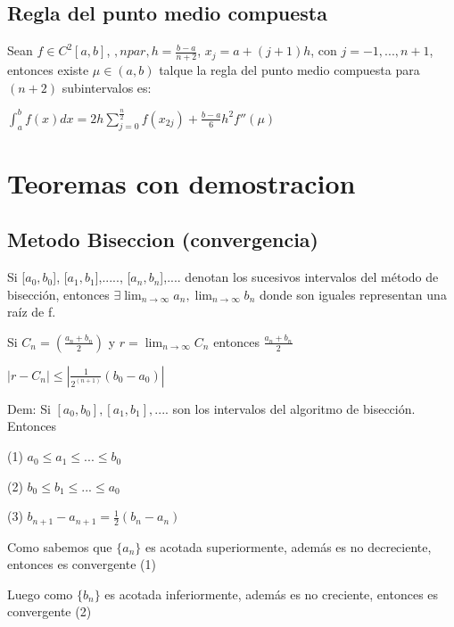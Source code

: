 \documentclass{article}
\begin{document}
 \subsection{Regla del punto medio compuesta}\label{medio}

Sean $f \in C^2[a,b]$, $, n par, h = \frac{b-a}{n+2}$, $x_j = a+(j+1)h$, con $j=-1,...,n+1$, entonces existe $\mu \in (a,b)$
talque la regla del punto medio compuesta para $(n+2)$ subintervalos es:

 \vspace{5mm}

$\displaystyle\int_{a}^{b}f(x)dx = 2h \sum\limits_{j=0}^{\frac{n}{2}}f(x_{2j})
 + \frac{b-a}{6}h^2f''(\mu)$

\vspace{5mm}

\section{Teoremas con demostracion}

\subsection{Metodo Biseccion (convergencia)}\label{Metodo-Biseccion-(convergencia)}

Si [$a_0,b_0$], [$a_1,b_1$],....., [$a_n,b_n$],.... denotan los sucesivos intervalos del método de bisección, entonces
$ \exists \lim_{n \to \infty} a_n, \lim_{n \to \infty} b_n $ donde son iguales representan una raíz de f.

Si $  C_n =  \left( \displaystyle\frac{a_n+b_n}{2} \right) $ y $r = \lim_{n \to \infty} C_n$ entonces
$\frac{a_n+b_n}{2}$

$| r - C_n | \leq | \frac{1}{2^{(n+1)}}(b_0 - a_0) |$

 \vspace{5mm}


Dem: Si $[a_0,b_0],[a_1,b_1],....$ son los intervalos del algoritmo de bisección. Entonces

(1) $a_0 \leq a_1 \leq ... \leq b_0 $

(2) $b_0 \leq b_1 \leq ... \leq a_0 $

(3) $b_{n+1}-a_{n+1} = \frac{1}{2}(b_n-a_n)$


Como sabemos que $\{ a_n \}$ es acotada superiormente, además es no decreciente, entonces es convergente (1)

Luego como $\{ b_n \}$ es acotada inferiormente, además es no creciente, entonces es convergente (2)
\end{document}
